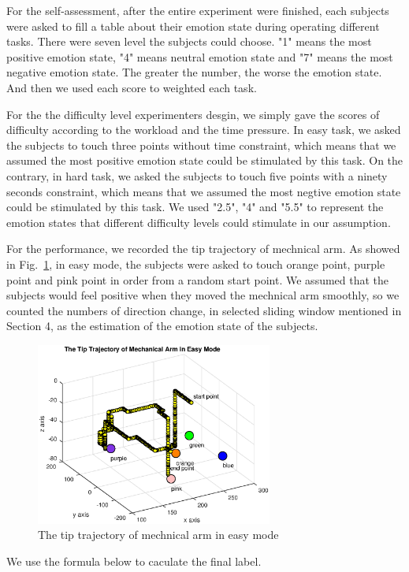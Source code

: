 \documentclass[runningheads,a4paper]{llncs}
\begin{document}
For the self-assessment, after the entire experiment were finished,
each subjects were asked to fill a table about their emotion state during
operating different tasks. There were seven level the subjects could choose.
"1" means the most positive emotion state, "4" means neutral emotion state and
"7" means the most negative emotion state. The greater the number, the worse the
emotion state. And then we used each score to weighted each task.

For the the difficulty level experimenters desgin, we simply gave the scores of
difficulty according to the workload and the time pressure. In easy task, we
asked the subjects to touch three points without time constraint, which means that
we assumed the most positive emotion state could be stimulated by this task.
On the contrary, in hard task, we asked the subjects to touch five points with a ninety seconds
constraint, which means that we assumed the most negtive emotion state could be stimulated by
this task. We used "2.5", "4" and "5.5" to represent the emotion states that different difficulty levels
could stimulate in our assumption.

For the performance, we recorded the tip trajectory of mechnical arm. As showed
in Fig.~\ref{fig:track}, in easy mode, the subjects were asked to touch orange
point, purple point and pink point in order from a random start point. We assumed
that the subjects would feel positive when they moved the mechnical arm smoothly,
so we counted the numbers of direction change, in selected sliding window
mentioned in Section 4, as the estimation of the emotion state of the subjects.

\begin{figure}
  \centering
  \includegraphics[height=6cm]{images/14}
  \caption{The tip trajectory of mechnical arm in easy mode}
  \label{fig:track}
\end{figure}

We use the formula below to caculate the final label.
\end{document}
